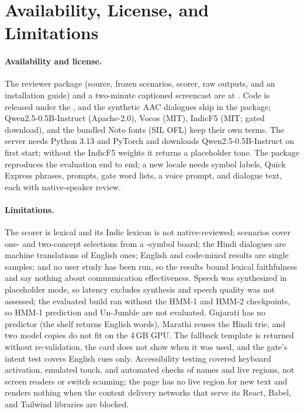\section{Availability, License, and Limitations}
\label{sec:limits}

\paragraph{Availability and license.}
The reviewer package (source, frozen scenarios, scorer, raw outputs, and an installation guide) and a two-minute captioned screencast are at \demourl{}.
Code is released under the \codelicense{}, and the synthetic AAC dialogues ship in the package; Qwen2.5-0.5B-Instruct (Apache-2.0), Vocos (MIT), IndicF5 (MIT; gated download), and the bundled Noto fonts (SIL OFL) keep their own terms.
The server needs Python 3.13 and PyTorch and downloads Qwen2.5-0.5B-Instruct on first start; without the IndicF5 weights it returns a placeholder tone.
The package reproduces the evaluation end to end; a new locale needs symbol labels, Quick Express phrases, prompts, gate word lists, a voice prompt, and dialogue text, each with native-speaker review.

\paragraph{Limitations.}
The scorer is lexical and its Indic lexicon is not native-reviewed; scenarios cover one- and two-concept selections from a \NSymbols{}-symbol board; the Hindi dialogues are machine translations of English ones; English and code-mixed results are single samples; and no user study has been run, so the results bound lexical faithfulness and say nothing about communication effectiveness.
Speech was synthesized in placeholder mode, so latency excludes synthesis and speech quality was not assessed; the evaluated build ran without the HMM-1 and HMM-2 checkpoints, so HMM-1 prediction and Un-Jumble are not evaluated.
Gujarati has no predictor (the shelf returns English words), Marathi reuses the Hindi trie, and two model copies do not fit on the 4\,GB GPU.
The fallback template is returned without re-validation, the card does not show when it was used, and the gate's intent test covers English cues only.
Accessibility testing covered keyboard activation, emulated touch, and automated checks of names and live regions, not screen readers or switch scanning; the page has no live region for new text and renders nothing when the content delivery networks that serve its React, Babel, and Tailwind libraries are blocked.

